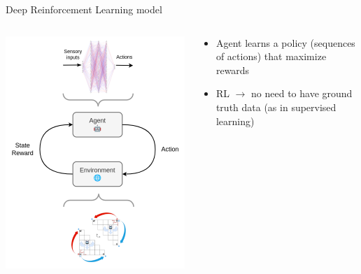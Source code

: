 \documentclass[bigger]{beamer}
\begin{document}
\begin{frame}[label={sec:orgb95da7f}]{Deep Reinforcement Learning model}
\begin{columns}
\begin{column}[c]{0.5\columnwidth}
\begin{center}
\includegraphics[height=0.9\textheight]{medias/nn.drawio.png}
\end{center}
\end{column}
\begin{column}[c]{0.5\columnwidth}
\pause
\begin{itemize}
\item Agent learns a policy (sequences of actions) that maximize rewards
\end{itemize}
\pause
\begin{itemize}
\item RL \(\to\) no need to have ground truth data (as in supervised learning)
\end{itemize}
\end{column}
\end{columns}
\end{frame}
\end{document}
